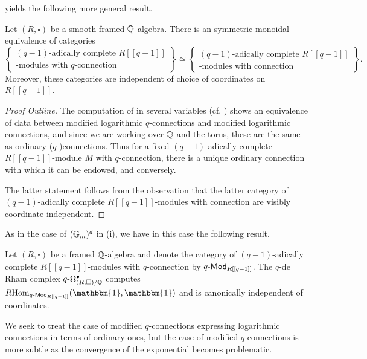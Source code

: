  yields the following more general result. 
\begin{proposition}\label{prop: R-modules with ordinary connection}
    Let $(R,\square)$ be a smooth framed $\mathbb{Q}$-algebra. There is an symmetric monoidal equivalence of categories 
    $$\left\{\substack{(q-1)\text{-adically complete }R[[q-1]] \\ \text{-modules with }q\text{-connection}}\right\}\simeq\left\{\substack{(q-1)\text{-adically complete }R[[q-1]] \\ \text{-modules with connection}}\right\}.$$
    Moreover, these categories are independent of choice of coordinates on $R[[q-1]]$. 
\end{proposition}
\begin{proof}[Proof Outline]
    The computation of  in several variables (cf. \cite[Lem. 4.1]{qDeformations}) shows an equivalence of data between modified logarithmic $q$-connections and modified logarithmic connections, and since we are working over $\mathbb{Q}$ and the torus, these are the same as ordinary ($q$-)connections. Thus for a fixed $(q-1)$-adically complete $R[[q-1]]$-module $M$ with $q$-connection, there is a unique ordinary connection with which it can be endowed, and conversely.
    
    The latter statement follows from the observation that the latter category of $(q-1)$-adically complete $R[[q-1]]$-modules with connection are visibly coordinate independent. 
\end{proof}
As in the case of $(\mathbb{G}_{m})^{d}$ in  (i), we have in this case the following result. 
\begin{corollary}\label{corr: modules with q-connection are coordinate independent}
    Let $(R,\square)$ be a framed $\mathbb{Q}$-algebra and denote the category of $(q-1)$-adically complete $R[[q-1]]$-modules with $q$-connection by $q\text{-}\mathsf{Mod}_{R[[q-1]]}$. The $q$-de Rham complex $q\text{-}\Omega_{(R,\square)/\mathbb{Q}}^{\bullet}$ computes $R\Hom_{q\dash\Mod_{R[[q-1]]}}(\mathbbm{1},\mathbbm{1})$ and is canonically independent of coordinates. 
\end{corollary}
We seek to treat the case of modified $q$-connections expressing logarithmic connections in terms of ordinary ones, but the case of modified $q$-connections is more subtle as the convergence of the exponential becomes problematic. 

